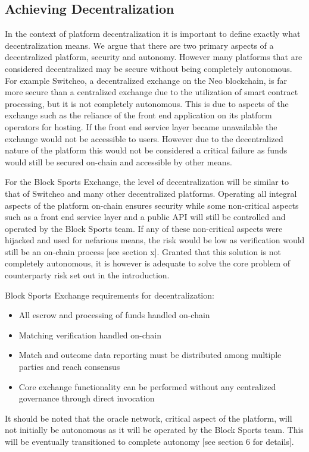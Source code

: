 \documentclass{article}
\begin{document}
	\clearpage
	\subsection{Achieving Decentralization}
In the context of platform decentralization it is important to define exactly what decentralization means. We argue that there are two primary aspects of a decentralized platform, security and autonomy. However many platforms that are considered decentralized may be secure without being completely autonomous. For example Switcheo, a decentralized exchange on the Neo blockchain, is far more secure than a centralized exchange due to the utilization of smart contract processing, but it is not completely autonomous. This is due to aspects of the exchange such as the reliance of the front end application on its platform operators for hosting. If the front end service layer became unavailable the exchange would not be accessible to users. However due to the decentralized nature of the platform this would not be considered a critical failure as funds would still be secured on-chain and accessible by other means. 

For the Block Sports Exchange, the level of decentralization will be similar to that of Switcheo and many other decentralized platforms. Operating all integral aspects of the platform on-chain ensures security while some non-critical aspects such as a front end service layer and a public API will still be controlled and operated by the Block Sports team. If any of these non-critical aspects were hijacked and used for nefarious means, the risk would be low as verification would still be an on-chain process [see section x]. Granted that this solution is not completely autonomous, it is however is adequate to solve the core problem of counterparty risk set out in the introduction. 

Block Sports Exchange requirements for decentralization:
\begin{itemize}
	\item All escrow and processing of funds handled on-chain
	\item Matching verification handled on-chain
	\item Match and outcome data reporting must be distributed among multiple parties and reach consensus
	\item Core exchange functionality can be performed without any centralized governance through direct invocation  
\end{itemize}

It should be noted that the oracle network, critical aspect of the platform, will not initially be autonomous as it will be operated by the Block Sports team. This will be eventually transitioned to complete autonomy [see section 6 for details]. 
		
\end{document}
